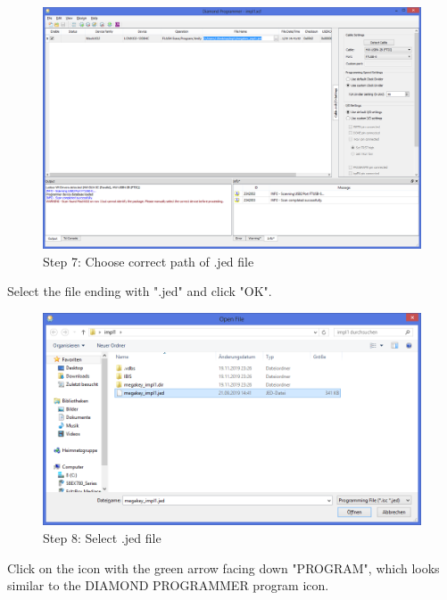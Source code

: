 \begin{figure}
  \includegraphics[width=\linewidth]{images/diamond07.png}
  \caption{Step 7: Choose correct path of .jed file}
  \label{fig:diamond07}
\end{figure}

Select the file ending with ".jed" and click "OK".

\begin{figure}
  \includegraphics[width=\linewidth]{images/diamond08.png}
  \caption{Step 8: Select .jed file}
  \label{fig:diamond08}
\end{figure}

Click on the icon with the green arrow facing down "PROGRAM", which looks similar to the DIAMOND PROGRAMMER program icon.


